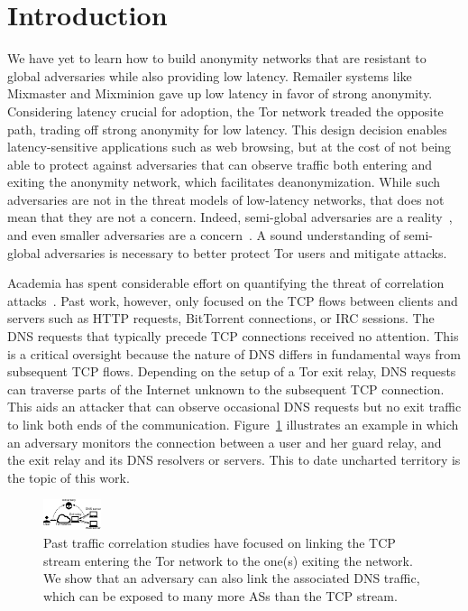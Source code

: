 \section{Introduction}
\label{sec:introduction}

We have yet to learn how to build anonymity networks that are resistant to
global adversaries while also providing low latency.  Remailer systems like
Mixmaster and Mixminion gave up low latency in favor of strong anonymity.
Considering latency crucial for adoption, the Tor network treaded the opposite
path, trading off strong anonymity for low latency.  This design decision
enables latency-sensitive applications such as web browsing, but at the cost of
not being able to protect against adversaries that can observe traffic both
entering and exiting the anonymity network, which facilitates deanonymization.
While such adversaries are not in the threat models of low-latency networks,
that does not mean that they are not a concern.  Indeed, semi-global adversaries
are a reality~\cite{Farrell2014a}, and even smaller adversaries are a
concern~\cite{Johnson2013a}.  A sound understanding of semi-global adversaries
is necessary to better protect Tor users and mitigate attacks.

Academia has spent considerable effort on quantifying the threat of correlation
attacks~\cite{Johnson2013a,Murdoch2007a}.  Past work, however, only focused on
the TCP flows between clients and servers such as HTTP requests, BitTorrent
connections, or IRC sessions.  The DNS requests that typically precede TCP
connections received no attention.  This is a critical oversight because the
nature of DNS differs in fundamental ways from subsequent TCP flows.  Depending
on the setup of a Tor exit relay, DNS requests can traverse parts of the
Internet unknown to the subsequent TCP connection.  This aids an attacker that
can observe occasional DNS requests but no exit traffic to link both ends of the
communication.  Figure~\ref{fig:overview} illustrates an example in which an
adversary monitors the connection between a user and her guard relay, and the
exit relay and its DNS resolvers or servers.  This to date uncharted territory
is the topic of this work.

\begin{figure}[t]
	\centering
	\includegraphics[width=0.65\linewidth]{figures/attack-concept.pdf}
	\caption{Past traffic correlation studies have focused on linking the TCP
		stream entering the Tor network to the one(s) exiting the network.  We
		show that an adversary can also link the associated DNS traffic, which
		can be exposed to many more ASs than the TCP stream.}
	\label{fig:overview}
\end{figure}

